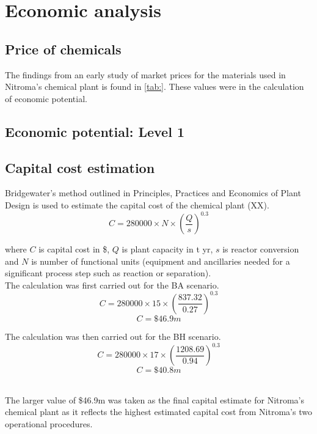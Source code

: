 
\section{Economic analysis}
\label{app:economics}
\subsection{Price of chemicals}

The findings from an early study of market prices for the materials used in Nitroma's chemical plant is found in \cref{tab:}. These values were in the calculation of economic potential.

\subsection{Economic potential: Level 1}

\subsection{Capital cost estimation}

Bridgewater's method outlined in Principles, Practices and Economics of Plant Design is used to estimate the capital cost of the chemical plant (XX).
\begin{equation}
    C=280000 \times N \times (\frac{Q}{s})^0.3
\end{equation}

where $C$ is capital cost in \$, $Q$ is  plant capacity in t yr, $s$ is reactor conversion and $N$ is number of functional units (equipment and ancillaries needed for a significant process step such as reaction or separation).\\
The calculation was first carried out for the BA scenario.
\begin{equation}
    C=280000 \times 15 \times (\frac{837.32}{0.27})^0.3
\end{equation}
\begin{equation}
    C=\$46.9m
\end{equation}
    
The calculation was then carried out for the BH scenario.
\begin{equation}
    C=280000 \times 17 \times (\frac{1208.69}{0.94} )^0.3
\end{equation}
\begin{equation}
    C=\$40.8m
\end{equation}

\\The larger value of \$46.9m was taken as the final capital estimate for Nitroma's chemical plant as it reflects the highest estimated capital cost from Nitroma's two operational procedures.